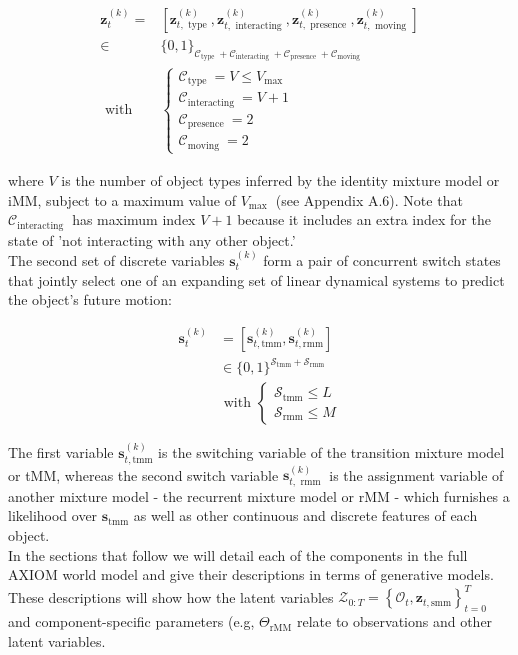 \documentclass[10pt]{article}
\begin{document}
$$
\begin{aligned}
\mathbf{z}_{t}^{(k)}= & {\left[\mathbf{z}_{t, \text { type }}^{(k)}, \mathbf{z}_{t, \text { interacting }}^{(k)}, \mathbf{z}_{t, \text { presence }}^{(k)}, \mathbf{z}_{t, \text { moving }}^{(k)}\right] } \\
\in & \{0,1\}_{\mathcal{C}_{\text {type }}+\mathcal{C}_{\text {interacting }}+\mathcal{C}_{\text {presence }}+\mathcal{C}_{\text {moving }}} \\
\text { with } & \left\{\begin{array}{l}
\mathcal{C}_{\text {type }}=V \leq V_{\text {max }} \\
\mathcal{C}_{\text {interacting }}=V+1 \\
\mathcal{C}_{\text {presence }}=2 \\
\mathcal{C}_{\text {moving }}=2
\end{array}\right.
\end{aligned}
$$

where $V$ is the number of object types inferred by the identity mixture model or iMM, subject to a maximum value of $V_{\text {max }}$ (see Appendix A.6). Note that $\mathcal{C}_{\text {interacting }}$ has maximum index $V+1$ because it includes an extra index for the state of 'not interacting with any other object.'\\
The second set of discrete variables $\mathbf{s}_{t}^{(k)}$ form a pair of concurrent switch states that jointly select one of an expanding set of linear dynamical systems to predict the object's future motion:

$$
\begin{aligned}
\mathbf{s}_{t}^{(k)} & =\left[\mathbf{s}_{t, \mathrm{tmm}}^{(k)}, \mathbf{s}_{t, \mathrm{rmm}}^{(k)}\right] \\
& \in\{0,1\}^{\mathcal{S}_{\mathrm{tmm}}+\mathcal{S}_{\mathrm{rmm}}} \\
& \text { with }\left\{\begin{array}{l}
\mathcal{S}_{\mathrm{tmm}} \leq L \\
\mathcal{S}_{\mathrm{rmm}} \leq M
\end{array}\right.
\end{aligned}
$$

The first variable $\mathbf{s}_{t, \mathrm{tmm}}^{(k)}$ is the switching variable of the transition mixture model or tMM, whereas the second switch variable $\mathbf{s}_{t, \text { rmm }}^{(k)}$ is the assignment variable of another mixture model - the recurrent mixture model or rMM - which furnishes a likelihood over $\mathbf{s}_{\mathrm{tmm}}$ as well as other continuous and discrete features of each object.\\
In the sections that follow we will detail each of the components in the full AXIOM world model and give their descriptions in terms of generative models. These descriptions will show how the latent variables $\mathcal{Z}_{0: T}=\left\{\mathcal{O}_{t}, \mathbf{z}_{t, \mathrm{smm}}\right\}_{t=0}^{T}$ and component-specific parameters (e.g, $\Theta_{\mathrm{rMM}}$ relate to observations and other latent variables.
\end{document}
